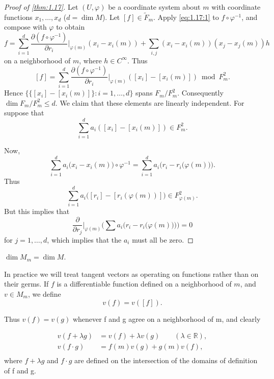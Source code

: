 \begin{proof}[Proof of \ref{thm:1.17}]
	Let $(U,\varphi)$ be a coordinate system about $m$ with coordinate
	functions $x_1,\ldots,x_d$ ($d=\dim M$). Let $[f]\in\widetilde{F}_m$. Apply \eqref{eq:1.17:1}
	to $f\circ\varphi^{-1}$, and compose with $\varphi$ to obtain
	\[
		f=\sum_{i=1}^{d}\frac{\partial(f\circ\varphi^{-1})}{\partial r_{i}}\bigg|_{\varphi(m)}(x_{i}-x_{i}(m))+\sum_{i,j}(x_{i}-x_{i}(m))(x_{j}-x_{j}(m))h
	\]
	on a neighborhood of $m$, where $h \in C^{\infty}$. Thus
	\[
		[f]=\sum_{i=1}^{d}\frac{\partial(f\circ\varphi^{-1})}{\partial r_{i}}\bigg|_{\varphi(m)}\left([x_{i}]-[x_{i}(m)]\right)\bmod F_{m}^{2}.
	\]
	Hence $\{\{[x_{i}]-[x_{i}(m)]\}: i=1,\ldots,d\}$ spans $F_{m}/F_{m}^{2}$. Consequently $\dim F_{m}/F_{m}^{2} \leq d$. We claim
	that these elements are linearly independent. For suppose that
	\[
		\sum_{i=1}^{d}a_{i}([x_{i}]-[x_{i}(m)])\in F_{m}^{2}.
	\]

	Now,
	\[
		\sum_{i=1}^{d}a_{i}\big(x_{i}-x_{i}(m)\big)\circ\varphi^{-1}=\sum_{i=1}^{d}a_{i}\big(r_{i}-r_{i}\big(\varphi(m)\big)\big).
	\]
	Thus
	\[
		\sum_{i=1}^{d}a_{i}\big([r_{i}]-[r_i(\varphi(m))]\big)\in F_{\varphi(m)}^{2}.
	\]
	But this implies that
	\[
		\frac{\partial}{\partial r_{j}}\bigg|_{\varphi(m)}\big(\textstyle\sum a_{i}\big(r_{i}-r_{i}\big(\varphi(m)\big)\big)\big)=0
	\]
	for $j=1,\ldots,d$, which implies that the $a_{i}$ must all be zero.
\end{proof}

\begin{corollary*}
	$\dim M_{m} = \dim M$.
\end{corollary*}

\label{thm:1.18}
In practice we will treat tangent vectors as operating on functions rather than on their germs.
If $f$ is a differentiable function defined on a neighborhood of $m$, and $v \in M_{m}$, we define
\begin{equation}
	\label{eq:1.18:1}
	v(f)=v([f]).
\end{equation}

Thus  $ v(f) = v(g) $ whenever f and g agree on a neighborhood of m, and clearly

\begin{equation}
	\label{eq:1.18:2}
	\begin{aligned}{v(f+\lambda g)}&{{}=v(f)+\lambda v(g)\qquad(\lambda\in\mathbb{R}),}\\ {v(f\cdot g)}&{{}=f(m)v(g)+g(m)v(f),}\\ \end{aligned}
\end{equation}
where  $ f + \lambda g $ and  $ f \cdot g $ are defined on the intersection of the domains of definition of f and g.


